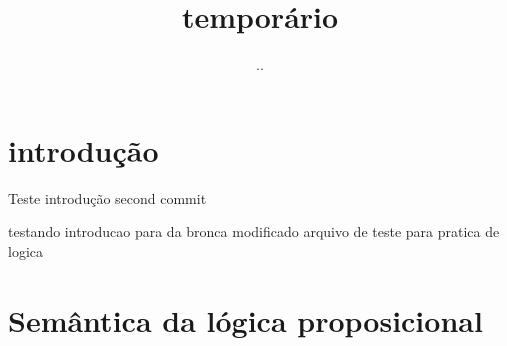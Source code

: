 \documentclass{article}
\title{temporário}
\author{..}
\begin{document}
\maketitle

\section{introdução}


Teste introdução
second commit

testando introducao para da bronca
modificado
arquivo de teste para pratica de logica
\section{Semântica da lógica proposicional}
\end{document}
